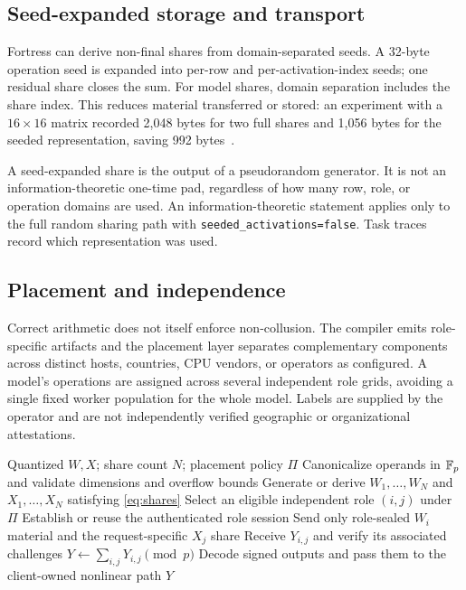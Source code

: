 \subsection{Seed-expanded storage and transport}

Fortress can derive non-final shares from domain-separated seeds. A 32-byte operation seed is expanded into per-row and per-activation-index seeds; one residual share closes the sum. For model shares, domain separation includes the share index. This reduces material transferred or stored: an experiment with a $16\times16$ matrix recorded 2,048 bytes for two full shares and 1,056 bytes for the seeded representation, saving 992 bytes~\cite{xurcroh-arithmetic}.

\begin{limitation}
A seed-expanded share is the output of a pseudorandom generator. It is not an information-theoretic one-time pad, regardless of how many row, role, or operation domains are used. An information-theoretic statement applies only to the full random sharing path with \texttt{seeded\_activations=false}. Task traces record which representation was used.
\end{limitation}

\subsection{Placement and independence}

Correct arithmetic does not itself enforce non-collusion. The compiler emits role-specific artifacts and the placement layer separates complementary components across distinct hosts, countries, CPU vendors, or operators as configured. A model's operations are assigned across several independent role grids, avoiding a single fixed worker population for the whole model. Labels are supplied by the operator and are not independently verified geographic or organizational attestations.

\begin{algorithm}[htbp]
\caption{One shared matrix operation}
\label{alg:grid}
\begin{algorithmic}[1]
\Require Quantized $W,X$; share count $N$; placement policy $\Pi$
\State Canonicalize operands in $\mathbb{F}_{p}$ and validate dimensions and overflow bounds
\State Generate or derive $W_1,\ldots,W_N$ and $X_1,\ldots,X_N$ satisfying \cref{eq:shares}
  \State Select an eligible independent role $(i,j)$ under $\Pi$
  \State Establish or reuse the authenticated role session
  \State Send only role-sealed $W_i$ material and the request-specific $X_j$ share
  \State Receive $Y_{i,j}$ and verify its associated challenges
\EndFor
\State $Y\gets\sum_{i,j}Y_{i,j}\pmod p$
\State Decode signed outputs and pass them to the client-owned nonlinear path
\State \Return $Y$
\end{algorithmic}
\end{algorithm}

